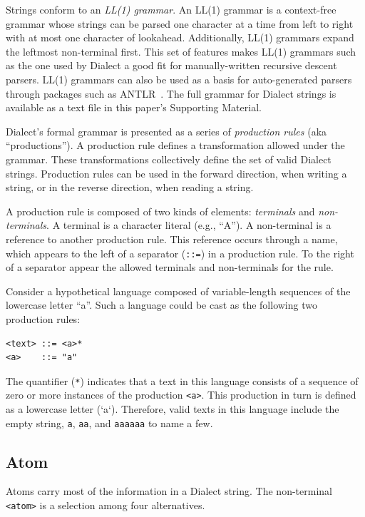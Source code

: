 \documentclass{article}
\def\ttt{\texttt}
\begin{document}
Strings conform to an \textit{LL(1) grammar}. An LL(1) grammar is a context-free grammar whose strings can be parsed one character at a time from left to right with at most one character of lookahead. Additionally, LL(1) grammars expand the leftmost non-terminal first. This set of features makes LL(1) grammars such as the one used by Dialect a good fit for manually-written recursive descent parsers. LL(1) grammars can also be used as a basis for auto-generated parsers through packages such as ANTLR~\cite{parr:2014}. The full grammar for Dialect strings is available as a text file in this paper's Supporting Material.

Dialect's formal grammar is presented as a series of \textit{production rules} (aka \enquote{productions}). A production rule defines a transformation allowed under the grammar. These transformations collectively define the set of valid Dialect strings. Production rules can be used in the forward direction, when writing a string, or in the reverse direction, when reading a string. 

A production rule is composed of two kinds of elements: \textit{terminals} and \textit{non-terminals}. A terminal is a character literal (e.g., \enquote{A}). A non-terminal is a reference to another production rule. This reference occurs through a name, which appears to the left of a separator (\ttt{::=}) in a production rule. To the right of a separator appear the allowed terminals and non-terminals for the rule.

Consider a hypothetical language composed of variable-length sequences of the lowercase letter \enquote{a}. Such a language could be cast as the following two production rules:

\begin{lstlisting}
<text> ::= <a>*
<a>    ::= "a"
\end{lstlisting}

The quantifier (\ttt{*}) indicates that a text in this language consists of a sequence of zero or more instances of the production \ttt{<a>}. This production in turn is defined as a lowercase letter (`a`). Therefore, valid texts in this language include the empty string, \ttt{a}, \ttt{aa}, and \ttt{aaaaaa} to name a few.

\subsection*{Atom}

Atoms carry most of the information in a Dialect string. The non-terminal \ttt{<atom>} is a selection among four alternatives.
\end{document}
